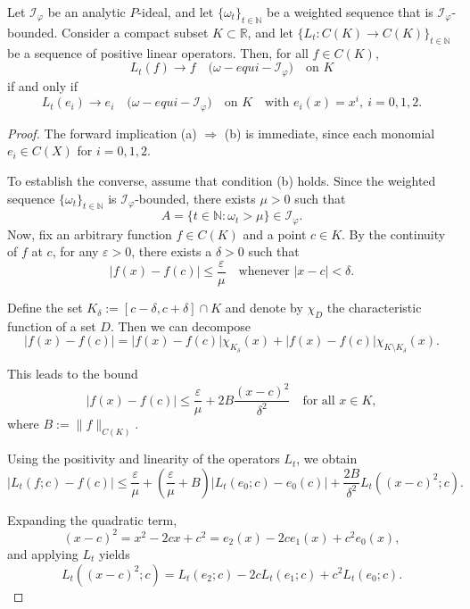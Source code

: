 \documentclass[reqno]{amsart}
\begin{document}
{\begin{theorem}
		Let $\mathcal{I}_{\varphi}$ be an analytic $P$-ideal, and let $\{\omega_t\}_{t \in \mathbb{N}}$ be a weighted sequence that is $\mathcal{I}_{\varphi}$-bounded. Consider a compact subset $K \subset \mathbb{R}$, and let $\{L_t : C(K) \to C(K)\}_{t \in \mathbb{N}}$ be a sequence of positive linear operators.
		 Then, for all $f \in C(K)$, 
	\begin{equation*}
	L_t(f) \to f \quad \text{($\omega-equi-\mathcal{I}_{\varphi}$)} \quad \text{on } K \tag{a}
\end{equation*}
	if and only if
\begin{equation}
		L_t(e_i) \to e_i \quad \text{($\omega-equi-\mathcal{I}_{\varphi}$)} \quad \text{on } K \quad \text{with } e_i(x) = x^i, \ i = 0, 1, 2\tag{b}.
\end{equation}
\end{theorem}
	\begin{proof}
		The forward implication (a) $\Rightarrow$ (b) is immediate, since each monomial $e_i \in C(X)$ for $i = 0, 1, 2$.
	

To establish the converse, assume that condition (b) holds. Since the weighted sequence $\{\omega_{t}\}_{t\in\mathbb{N}}$ is $\mathcal{I}_{\varphi}$-bounded, there exists $\mu>0$ such that 
$$
A=\{t\in\mathbb{N}:\omega_t>\mu\}\in\mathcal{I}_{\varphi}.
$$
Now, fix an arbitrary function $f \in C(K)$ and a point $c \in K$. By the continuity of $f$ at $c$, for any $\varepsilon > 0$, there exists a $\delta > 0$ such that
\[
|f(x) - f(c)| \leq \frac{\varepsilon}{\mu} \quad \text{whenever } |x - c| < \delta.
\]

Define the set $K_\delta := [c - \delta, c + \delta] \cap K$ and denote by $\chi_D$ the characteristic function of a set $D$. Then we can decompose
\[
|f(x) - f(c)| = |f(x) - f(c)| \chi_{K_\delta}(x) + |f(x) - f(c)| \chi_{K \setminus K_\delta}(x).
\]

This leads to the bound
\[
|f(x) - f(c)| \leq \frac{\varepsilon}{\mu} + 2B \frac{(x - c)^2}{\delta^2} \quad \text{for all } x \in K,
\]
where $B := \|f\|_{C(K)}$.

Using the positivity and linearity of the operators $L_t$, we obtain
\[
|L_t(f; c) - f(c)| \leq \frac{\varepsilon}{\mu} + (\frac{\varepsilon}{\mu} + B) |L_t(e_0; c) - e_0(c)| + \frac{2B}{\delta^2} L_t\left((x - c)^2; c\right).
\]

Expanding the quadratic term,
\[
(x - c)^2 = x^2 - 2cx + c^2 = e_2(x) - 2c e_1(x) + c^2 e_0(x),
\]
and applying $L_t$ yields
\[
L_t\left((x - c)^2; c\right) = L_t(e_2; c) - 2c L_t(e_1; c) + c^2 L_t(e_0; c).
\]


\end{proof}}
\end{document}
